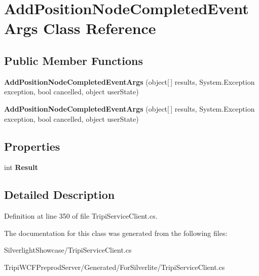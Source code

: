\hypertarget{class_add_position_node_completed_event_args}{
\section{AddPositionNodeCompletedEventArgs Class Reference}
\label{class_add_position_node_completed_event_args}
}
\subsection*{Public Member Functions}
\begin{DoxyCompactItemize}
\item 
\hypertarget{class_add_position_node_completed_event_args_aad97fc55c8f4d89ce812d73b94a7bd12}{
{\bfseries AddPositionNodeCompletedEventArgs} (object\mbox{[}$\,$\mbox{]} results, System.Exception exception, bool cancelled, object userState)}
\label{class_add_position_node_completed_event_args_aad97fc55c8f4d89ce812d73b94a7bd12}

\item 
\hypertarget{class_add_position_node_completed_event_args_aad97fc55c8f4d89ce812d73b94a7bd12}{
{\bfseries AddPositionNodeCompletedEventArgs} (object\mbox{[}$\,$\mbox{]} results, System.Exception exception, bool cancelled, object userState)}
\label{class_add_position_node_completed_event_args_aad97fc55c8f4d89ce812d73b94a7bd12}

\end{DoxyCompactItemize}
\subsection*{Properties}
\begin{DoxyCompactItemize}
\item 
\hypertarget{class_add_position_node_completed_event_args_a9070b67fcd56b400882828b7059a6637}{
int {\bfseries Result}}
\label{class_add_position_node_completed_event_args_a9070b67fcd56b400882828b7059a6637}

\end{DoxyCompactItemize}


\subsection{Detailed Description}


Definition at line 350 of file TripiServiceClient.cs.

The documentation for this class was generated from the following files:\begin{DoxyCompactItemize}
\item 
SilverlightShowcase/TripiServiceClient.cs\item 
TripiWCFPreprodServer/Generated/ForSilverlite/TripiServiceClient.cs\end{DoxyCompactItemize}
